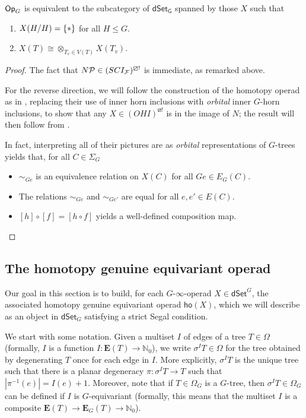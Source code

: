 \documentclass[a4paper,10pt
,draft
]{article}%
\renewcommand{\F}{\mathcal F}
\renewcommand{\1}{\eta}%
\begin{document}
\begin{proposition}
      $\mathsf{Op}_G$ is equivalent to the subcategory of $\mathsf{dSet_G}$ spanned by those $X$ such that
      \begin{enumerate}
      \item $X(H/H) = \set{\**}$ for all $H \leq G$.
      \item $X(T) \cong \otimes_{T_v \in V(T)}X(T_v)$. 
      \end{enumerate}
\end{proposition}
\begin{proof}
      The fact that $N\P \in (SCI_{\F})^{\boxslash !}$ is immediate, as remarked above.

      For the reverse direction, we will follow the construction of the homotopy operad as in \cite[\S 6]{MW09},
      replacing their use of inner horn inclusions with \textit{orbital} inner $G$-horn inclusions,
      to show that any $X \in (OHI)^{\boxslash !}$ is in the image of $N$; 
      the result will then follow from \cite[HYPER PROP]{BP_edss}.

      In fact, interpreting all of their pictures are as \textit{orbital} representations of $G$-trees yields that,
      for all $C \in \Sigma_G$
      \begin{itemize}
      \item $\sim_{G e}$ is an equivalence relation on $X(C)$ for all $Ge \in E_G(C)$.
      \item The relations $\sim_{G e}$ and $\sim_{G e'}$ are equal for all $e,e'\in E(C)$.
      \item $[h] \circ [f] = [h \circ f]$ yields a well-defined composition map.
      \end{itemize}
\end{proof}



\newpage

\subsection{The homotopy genuine equivariant operad}


Our goal in this section is to build,
for each $G$-$\infty$-operad $X \in \mathsf{dSet}^G$,
the associated homotopy genuine equivariant operad
$\mathsf{ho} (X)$,
which we will describe as an object in
$\mathsf{dSet}_G$
satisfying a strict Segal condition.


We start with some notation. 
Given a multiset $I$ of edges of a tree $T \in \Omega$
(formally, $I$ is a function 
$I \colon \boldsymbol{E}(T) \to \mathbb{N}_0$),
we write $\sigma^I T \in \Omega$
for the tree obtained by degenerating $T$ once for each edge in $I$.
More explicitly, $\sigma^I T$ is the unique tree such that there is a planar degeneracy
$\pi \colon \sigma^I T \to T$
such that $|\pi^{-1}(e)| = I(e) + 1$.
Moreover,
note that if $T\in \Omega_G$ is a $G$-tree, 
then $\sigma^{I} T \in \Omega_{G}$
can be defined if $I$ is $G$-equivariant
(formally, this means that the multiset $I$ is a composite
$\boldsymbol{E}(T) \to \boldsymbol{E}_G(T)
\to \mathbb{N}_0$).
\end{document}
